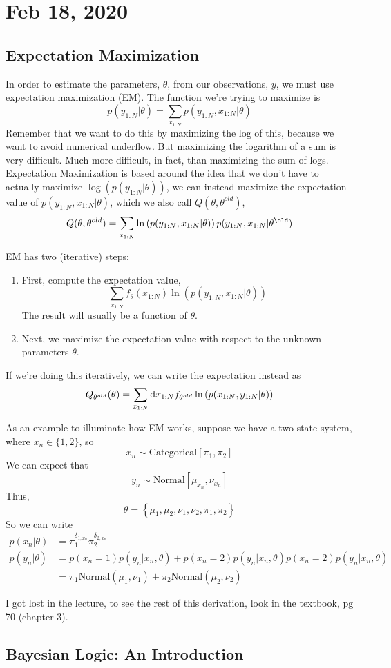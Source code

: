 \documentclass[a4paper]{article}
\begin{document}
\maketitle

\tableofcontents

\section{Feb 18, 2020}

\subsection{Expectation Maximization}
In order to estimate the parameters, $\theta$, from our observations, $y$, we
must use expectation maximization (EM). The function we're trying to maximize
is
\[
	p(y_{1:N} | \theta) = \sum_{x_{1:N}} p(y_{1:N},x_{1:N} | \theta)
\]
Remember that we want to do this by maximizing the log of this, because we want
to avoid numerical underflow. But maximizing the logarithm of a sum is very
difficult. Much more difficult, in fact, than maximizing the sum of logs.
Expectation Maximization is based around the idea that we don't have to
actually maximize $\log\left(p(y_{1:N} | \theta)\right)$, we can instead
maximize the expectation value of $p(y_{1:N},x_{1:N} | \theta)$, which we also
call $Q(\theta,\theta^{old})$,
\[
	Q(\theta,\theta^{old}) = 
	\sum_{x_{1:N}}\ln\left(p(y_{1:N},x_{1:N}|\theta)\right)
	p(y_{1:N},x_{1:N}|\theta^{\old})
\]

EM has two (iterative) steps:
\begin{enumerate}
	\item First, compute the expectation value,
		\[
			\sum_{x_{1:N}}
			f_{\theta}(x_{1:N})\ln\left(p(y_{1:N},x_{1:N}|\theta)\right)
		\]
		The result will usually be a function of $\theta$.
	\item Next, we maximize the expectation value with respect to the
		unknown parameters $\theta$.
\end{enumerate}
If we're doing this iteratively, we can write the expectation instead as
\[
	Q_{\theta^{old}}(\theta) = \sum_{x_{1:N}} \mathrm{d} x_{1:N} f_{\theta^{old}}
	\ln\left(p(x_{1:N},y_{1:N}|\theta)\right)
\]

As an example to illuminate how EM works, suppose we have a two-state system,
where $x_n \in \{1,2\}$, so
\[
	x_n \sim \mathrm{Categorical}[\pi_1,\pi_2]
\]
We can expect that
\[
	y_n \sim \mathrm{Normal}[\mu_{x_n},\nu_{x_n}]
\]
Thus,
\[
	\theta = \left\{\mu_1,\mu_2,\nu_1,\nu_2,\pi_1,\pi_2\right\}
\]
So we can write
\begin{align*}
	p(x_n|\theta) &= \pi_1^{\delta_{1,x_n}}\pi_2^{\delta_{2,x_n}}\\
	p(y_n|\theta) &= p(x_n=1)p(y_n|x_n,\theta) +p(x_n=2)p(y_n|x_n,\theta)
	p(x_n=2)p(y_n|x_n,\theta)\\
		      &= \pi_1 \mathrm{Normal}(\mu_1,\nu_1) +
		      \pi_2 \mathrm{Normal}(\mu_2,\nu_2)
\end{align*}

I got lost in the lecture, to see the rest of this derivation, look in the
textbook, pg 70 (chapter 3).

\subsection{Bayesian Logic: An Introduction}
\end{document}
